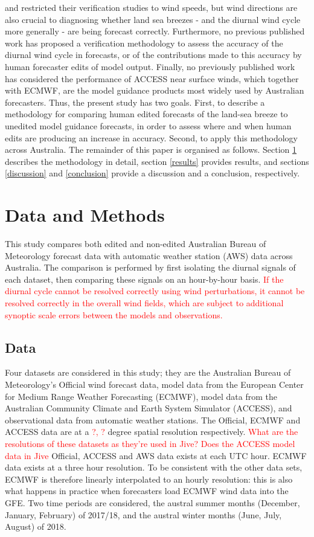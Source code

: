 \documentclass[alpha-refs]{wiley-article}
\begin{document}
\citet{pinson12} and \citet{lynch14} restricted their verification studies to wind speeds, but wind directions are also crucial to diagnosing whether land sea breezes - and the diurnal wind cycle more generally - are being forecast correctly. Furthermore, no previous published work has proposed a verification methodology to assess the accuracy of the diurnal wind cycle in forecasts, or of the contributions made to this accuracy by human forecaster edits of model output. Finally, no previously published work has considered the performance of ACCESS near surface winds, which together with ECMWF, are the model guidance products most widely used by Australian forecasters. Thus, the present study has two goals. First, to describe a methodology for comparing human edited forecasts of the land-sea breeze to unedited model guidance forecasts, in order to assess where and when human edits are producing an increase in accuracy. Second, to apply this methodology across Australia. The remainder of this paper is organised as follows. Section \ref{methods} describes the methodology in detail, section \ref{results} provides results, and sections \ref{discussion} and \ref{conclusion} provide a discussion and a conclusion, respectively.     

\section{Data and Methods} \label{methods}
This study compares both edited and non-edited Australian Bureau of Meteorology forecast data with automatic weather station (AWS) data across Australia. The comparison is performed by first isolating the diurnal signals of each dataset, then comparing these signals on an hour-by-hour basis. \textcolor{red}{If the diurnal cycle cannot be resolved correctly using wind perturbations, it cannot be resolved correctly in the overall wind fields, which are subject to additional synoptic scale errors between the models and observations.}

\subsection{Data} 
Four datasets are considered in this study; they are the Australian Bureau of Meteorology's Official wind forecast data, model data from the European Center for Medium Range Weather Forecasting (ECMWF), model data from the Australian Community Climate and Earth System Simulator (ACCESS), and observational data from automatic weather stations. The Official, ECMWF and ACCESS data are at a \textcolor{red}{?, ?} degree spatial resolution respectively. \textcolor{red}{What are the resolutions of these datasets as they're used in Jive? Does the ACCESS model data in Jive} Official, ACCESS and AWS data exists at each UTC hour. ECMWF data exists at a three hour resolution. To be consistent with the other data sets, ECMWF is therefore linearly interpolated to an hourly resolution: this is also what happens in practice when forecasters load ECMWF wind data into the GFE. Two time periods are considered, the austral summer months (December, January, February) of 2017/18, and the austral winter months (June, July, August) of 2018. 
\end{document}
